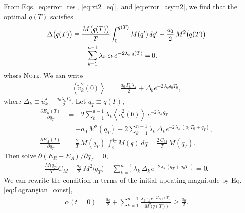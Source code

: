 \documentclass[reprint, superscriptaddress, floatfix]{revtex4-1}
\newcommand{\note}[1]{{\color{DarkGreen}\footnotesize \textsc{Note.} #1}}
\newcommand{\Err}{E}
\begin{document}
%
From Eqs. \eqref{eq:error_res},
\eqref{eq:xt2_eql},
and \eqref{eq:error_asym2},
we find that
the optimal $q(T)$ satisfies
%
\begin{align}
  \Delta\bigl( q(T) \bigr)
  &\equiv
  \frac{ M\bigl( q(T) \bigr) } { T }
    \int_0^{q(T)} M(q') \, d q'
  -\frac{a_0}{2} \, M^2\bigl( q(T) \bigr)
  \notag \\
  &\quad
  -\sum_{k = 1}^{n-1}
  \lambda_k \, \epsilon_k \, e^{-2\lambda_k \, q(T)}
  =0
  ,
\label{eq:opt_qT}
\end{align}
where
%
%
\note{We can write
\begin{align*}
  \left\langle
    {\tilde v}_k^2(0)
  \right\rangle
  &=
  \frac { a_0 \, \Gamma_k \, \lambda_k } { 2 }
  +
  \Delta_k
  e^{-2\, \lambda_k a_0 T_0}
  ,
\end{align*}
%
where $\Delta_k \equiv \tilde u_k^2 - \frac{a_0 \lambda_k \Gamma_k}{2}$.
%
Let $q_T \equiv q(T)$,
\begin{align*}
  \frac{
    \partial \Err_R(T)
  }
  {
    \partial q_T
  }
  &=
  -2\sum_{k=1}^{n-1} \lambda_k
  \left\langle
    \tilde v_k^2(0)
  \right\rangle \,
  e^{-2 \, \lambda_k \, q_T}
  \\
  &=
  -a_0 \, M^2(q_T)
  -2
  \sum_{k=1}^{n-1} \lambda_k \,
  \Delta_k e^{-2 \, \lambda_k \, (a_0 \, T_0 + q_T)}
  ,
  \\
  \frac{
    \partial \Err_A(T)
  }
  {
    \partial q_T
  }
  &=
  \frac 2 T \,
  M(q_T) \,
  \int_0^{ q_T } M(q) \, dq
  =
  \frac{ 2 \, C_M } { T } \, M(q_T)
  .
\end{align*}
Then solve $\partial (\Err_R + \Err_A) / \partial q_T = 0$,
\begin{align*}
  \frac{ M\bigl( q_T \bigr) } { T } C_M
  -\frac{a_0}{2} \, M^2\bigl( q_T \bigr)
  -\sum_{k = 1}^{n-1}
  \lambda_k \, \Delta_k \, e^{-2\lambda_k \, (q_T + a_0 T_0)}
  =0
  .
\end{align*}
}
%
We can rewrite the condition in terms of
the initial updating magnitude
by Eq. \eqref{eq:Lagrangian_const}, %
\begin{align}
  \alpha(t = 0)
  =
  \frac{ a_0 } { 2 }
  +
  \sum_{k = 1}^{n-1}
  \frac{
    \lambda_k \, \epsilon_k \, e^{-2\lambda_k \, q(T)}
  }{M^2\bigl( q(T) \bigr)}
  \ge
  \frac{ a_0 }
       { 2 }
  .
  \label{eq:half_alpha0}
\end{align}
\end{document}

